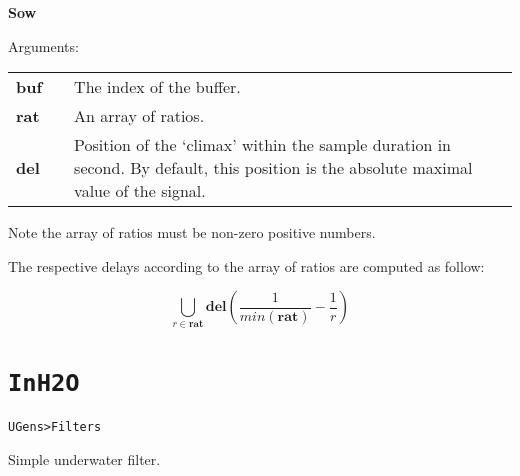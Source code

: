 \bigskip
\begin{addmargin}[1em]{0em}%
\begin{mdframed}[style=mystyle]

\bigskip

{\large \textbf{Sow}}

\hrulefill

\color{gray!80}Arguments:\color{black} 

\bigskip

\begin{tabular}{l c p{8cm}}
\textbf{buf} &  & The index of the buffer.\\
\textbf{rat} &  & An array of ratios.\\
\textbf{del} &  &  Position of the `climax' within the sample duration in second. By default, this position is the absolute maximal value of the signal.
\end{tabular}

\bigskip

\end{mdframed}
\end{addmargin}

\bigskip
Note the array of ratios must be non-zero positive numbers.

The respective delays according to the array of ratios are computed as follow:
 
\[
\bigcup_{r \in \mathbf{rat}} \mathbf{del} \left( \frac{1}{min(\mathbf{rat})} - \frac{1}{r} \right)
\]


\section{\texttt{InH2O}}
\label{inh2o}

\texttt{UGens>Filters}

\bigskip

Simple underwater filter.

